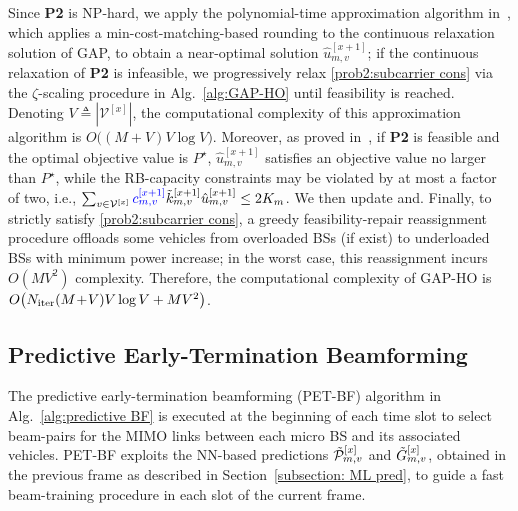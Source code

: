 \documentclass[10pt,journal,letterpaper]{journal_template/IEEEtran}
\newcommand{\rev}[1]{\textcolor{revisioncolor}{{}#1}}
\newif\ifshowdeletions
\newcommand{\currentdel}[1]{\ifshowdeletions\textcolor{deletioncolor}{\sout{#1}}\fi}
\theoremstyle{remark}
\begin{document}
Since \textbf{P2} is NP-hard, we apply the polynomial-time approximation algorithm in~\cite{shmoys1993approximation}, which applies a min-cost-matching-based rounding to the continuous relaxation solution of GAP, to obtain a near-optimal solution $\hat{u}_{m,v}^{[x+1]}$; if the continuous relaxation of \textbf{P2} is infeasible, we progressively relax \eqref{prob2:subcarrier cons} via the $\zeta$-scaling procedure in Alg.~\ref{alg:GAP-HO} until feasibility is reached. Denoting $V\triangleq|\mathcal{V}^{[x]}|$, the computational complexity of this approximation algorithm is $O\big((M\!+\!V)V\log V\big)$. Moreover, as proved in~\cite{shmoys1993approximation}, if \textbf{P2} is feasible and the optimal objective value is $P^{\star}$, $\hat{u}_{m,v}^{[x+1]}$ satisfies an objective value no larger than $P^{\star}$, while the RB-capacity constraints may be violated by at most a factor of two, i.e., $\sum_{v\in\mathcal{V}^{[x]}}\rev{c_{m,v}^{[x+1]}}\Tilde{k}_{m,v}^{[x+1]}\hat{u}_{m,v}^{[x+1]}\le 2K_m$. We then update \currentdel{$\Tilde{k}_{m}^{[x+1]}=\sum_{v\in\mathcal{V}^{[x]}}\Tilde{k}_{m,v}^{[x+1]}\hat{u}_{m,v}^{[x+1]}$} and\currentdel{ iterate until $\{\Tilde{k}_{m}^{[x+1]}\}$ converges or the maximum iteration number $N_{\rm iter}$ (set to $3$ in this paper) is reached}. 
Finally, to strictly satisfy \eqref{prob2:subcarrier cons}, a greedy feasibility-repair reassignment procedure offloads some vehicles from overloaded BSs (if exist) to underloaded BSs with minimum power increase; in the worst case, this reassignment incurs $O(MV^2)$ complexity. Therefore, the computational complexity of GAP-HO is
$O\!\left(N_{\rm iter}(M\!+\!V)V\log V + MV^2\right)$.

\subsection{Predictive Early-Termination Beamforming}
\label{subsection:PET-BF}

The predictive early-termination beamforming (PET-BF) algorithm in Alg.~\ref{alg:predictive BF} is executed at the beginning of each time slot to select beam-pairs for the MIMO links between each micro BS and its associated vehicles. PET-BF exploits the NN-based predictions $\Tilde{\mathcal{P}}_{m,v}^{[x]}$ and $\Tilde{G}_{m,v}^{[x]}$, obtained in the previous frame as described in Section~\ref{subsection: ML pred}, to guide a fast beam-training procedure in each slot of the current frame.
\end{document}
